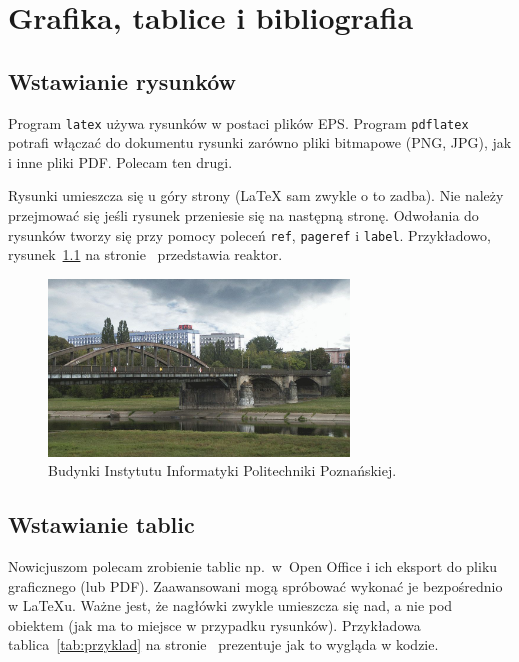 

\chapter{Grafika, tablice i bibliografia}

\section{Wstawianie rysunków}

Program \texttt{latex} używa rysunków w postaci plików EPS. Program \texttt{pdflatex}
potrafi włączać do dokumentu rysunki zarówno pliki bitmapowe (PNG, JPG),
jak i inne pliki PDF. Polecam ten drugi.

Rysunki umieszcza się u góry strony (\LaTeX{} sam zwykle o to zadba). Nie należy przejmować
się jeśli rysunek przeniesie się na następną stronę. Odwołania do rysunków
tworzy się przy pomocy poleceń \texttt{ref}, \texttt{pageref} i \texttt{label}.
Przykładowo, rysunek~\ref{rys:cwpp} na stronie~\pageref{rys:cwpp} przedstawia
reaktor.

\begin{figure}[t]
\begin{center}
\includegraphics[width=8cm]{figures/cw-pp.jpg}
\end{center}
\caption{Budynki Instytutu Informatyki Politechniki Poznańskiej.}\label{rys:cwpp}
\end{figure}



\section{Wstawianie tablic}

Nowicjuszom polecam zrobienie tablic np.~w~Open Office i ich eksport do pliku
graficznego (lub PDF). Zaawansowani mogą spróbować wykonać je bezpośrednio
w \LaTeX{}u. Ważne jest, że nagłówki zwykle umieszcza się nad, a nie pod
obiektem (jak ma to miejsce w przypadku rysunków). Przykładowa tablica~\ref{tab:przyklad}
na stronie~\pageref{tab:przyklad} prezentuje jak to wygląda w kodzie.

